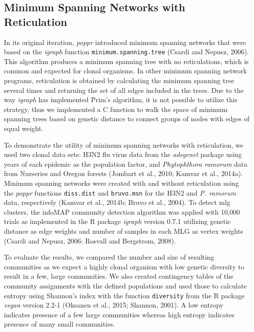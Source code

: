 \documentclass{frontiersSCNS} %
\begin{document}
\subsection*{Minimum Spanning Networks with
Reticulation}\label{minimum-spanning-networks-with-reticulation}

In its original iteration, \emph{poppr} introduced minimum spanning
networks that were based on the \emph{igraph} function
\texttt{minimum.spanning.tree} (Csardi and Nepusz, 2006). This algorithm
produces a minimum spanning tree with no reticulations, which is common
and expected for clonal organisms. In other minimum spanning network
programs, reticulation is obtained by calculating the minimum spanning
tree several times and returning the set of all edges included in the
trees. Due to the way \emph{igraph} has implemented Prim's algorithm, it
is not possible to utilize this strategy, thus we implemented a C
function to walk the space of minimum spanning trees based on genetic
distance to connect groups of nodes with edges of equal weight.

To demonstrate the utility of minimum spanning networks with
reticulation, we used two clonal data sets: H3N2 flu virus data from the
\emph{adegenet} package using years of each epidemic as the population
factor, and \emph{Phytophthora ramorum} data from Nurseries and Oregon
forests (Jombart et al., 2010; Kamvar et al., 2014a). Minimum spanning
networks were created with and without reticulation using the
\emph{poppr} functions \texttt{diss.dist} and \texttt{bruvo.msn} for the
H3N2 and \emph{P. ramorum} data, respectively (Kamvar et al., 2014b;
Bruvo et al., 2004). To detect mlg clusters, the infoMAP community
detection algorithm was applied with 10,000 trials as implemented in the
R package \emph{igraph} version 0.7.1 utilizing genetic distance as edge
weights and number of samples in each MLG as vertex weights (Csardi and
Nepusz, 2006; Rosvall and Bergstrom, 2008).

To evaluate the results, we compared the number and size of resulting
communities as we expect a highly clonal organism with low genetic
diversity to result in a few, large communities. We also created
contingency tables of the community assignments with the defined
populations and used those to calculate entropy using Shannon's index
with the function \texttt{diversity} from the R package \emph{vegan}
version 2.2-1 (Oksanen et al., 2015; Shannon, 2001). A low entropy
indicates presence of a few large communities whereas high entropy
indicates presence of many small communities.
\end{document}
